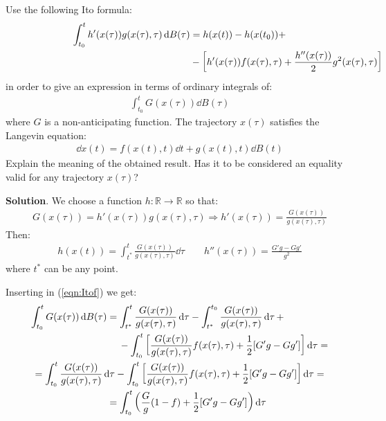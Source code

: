 \documentclass[../template.tex]{subfiles}
\begin{document}
\begin{exo}
    Use the following Ito formula:
    \begin{align}\label{eqn:Itof}
        \int_{t_0}^t h'(x(\tau)) g(x(\tau),\tau) \dd{B(\tau)} &= h(x(t))-h(x(t_0))+\span \\ \nonumber
        &- \left[h'(x(\tau)) f(x(\tau), \tau) + \frac{h''(x(\tau))}{2} g^2(x(\tau), \tau) \right]\dd{\tau} 
    \end{align}
    in order to give an expression in terms of ordinary integrals of:
    \begin{align*}
        \int_{t_0}^t G(x(\tau))\dd{B(\tau)}
    \end{align*}
    where $G$ is a non-anticipating function. The trajectory $x(\tau)$ satisfies the Langevin equation:
    \begin{align*}
        \dd{x(t)} = f(x(t),t) \dd{t} + g(x(t),t) \dd{B(t)}
    \end{align*}
    Explain the meaning of the obtained result. Has it to be considered an equality valid for any trajectory $x(\tau)$?

    \medskip

    \textbf{Solution}. We choose a function $h\colon \mathbb{R} \to \mathbb{R}$ so that:
    \begin{align*}
        G(x(\tau)) = h'(x(\tau)) g(x(\tau), \tau) \Rightarrow h'(x(\tau)) = \frac{G(x(\tau))}{g(x(\tau), \tau)} 
    \end{align*}
    Then:
    \begin{align*}
        h(x(t)) = \int_{t^*}^t \frac{G(x(\tau))}{g(x(\tau), \tau)}  \dd{\tau} \qquad h''(x(\tau)) = \frac{G'g - G g'}{g^2} 
    \end{align*}
    where $t^*$ can be any point.

    Inserting in (\ref{eqn:Itof}) we get:
    \begin{align*}
        \int_{t_0}^t G(x(\tau))\dd{B(\tau)} &= \int_{t^*}^t \frac{G(x(\tau))}{g(x(\tau), \tau)}  \dd{\tau} - \int_{t^*}^{t_0} \frac{G(x(\tau))}{g(x(\tau), \tau)}  \dd{\tau} +\\
        &\quad \> - \int_{t_0}^t \left[\frac{G(x(\tau))}{g(x(\tau), \tau)} f(x(\tau), \tau) + \frac{1}{2}[G'g - G g'] \right]\dd{\tau} =\\
        = \int_{t_0}^t \frac{G(x(\tau))}{g(x(\tau), \tau)}  \dd{\tau} - \int_{t_0}^t \left[\frac{G(x(\tau))}{g(x(\tau), \tau)} f(x(\tau), \tau) + \frac{1}{2}[G'g - G g'] \right]\dd{\tau} = \span\\
        &=\int_{t_0}^t \left(\frac{G}{g}(1-f) + \frac{1}{2}[G'g - Gg']  \right)\dd{\tau}
    \end{align*}
    
\end{exo}
\end{document}
